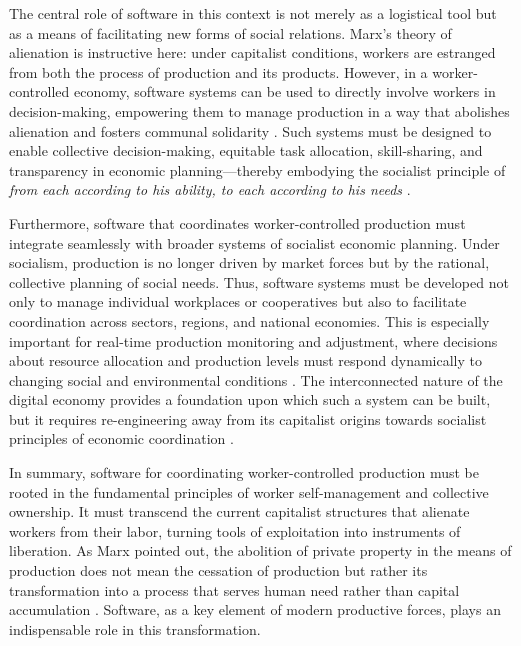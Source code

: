 \begin{refsection}
The central role of software in this context is not merely as a logistical tool but as a means of facilitating new forms of social relations. Marx’s theory of alienation is instructive here: under capitalist conditions, workers are estranged from both the process of production and its products. However, in a worker-controlled economy, software systems can be used to directly involve workers in decision-making, empowering them to manage production in a way that abolishes alienation and fosters communal solidarity \cite[pp.~45-47]{marx1959}. Such systems must be designed to enable collective decision-making, equitable task allocation, skill-sharing, and transparency in economic planning—thereby embodying the socialist principle of \textit{from each according to his ability, to each according to his needs} \cite[pp.~63-67]{lenin2017}.

Furthermore, software that coordinates worker-controlled production must integrate seamlessly with broader systems of socialist economic planning. Under socialism, production is no longer driven by market forces but by the rational, collective planning of social needs. Thus, software systems must be developed not only to manage individual workplaces or cooperatives but also to facilitate coordination across sectors, regions, and national economies. This is especially important for real-time production monitoring and adjustment, where decisions about resource allocation and production levels must respond dynamically to changing social and environmental conditions \cite[pp.~102-107]{mcluhan2005}. The interconnected nature of the digital economy provides a foundation upon which such a system can be built, but it requires re-engineering away from its capitalist origins towards socialist principles of economic coordination \cite[pp.~88-90]{negre2003}.

In summary, software for coordinating worker-controlled production must be rooted in the fundamental principles of worker self-management and collective ownership. It must transcend the current capitalist structures that alienate workers from their labor, turning tools of exploitation into instruments of liberation. As Marx pointed out, the abolition of private property in the means of production does not mean the cessation of production but rather its transformation into a process that serves human need rather than capital accumulation \cite[pp.~57-59]{marx1959}. Software, as a key element of modern productive forces, plays an indispensable role in this transformation.


\end{refsection}
